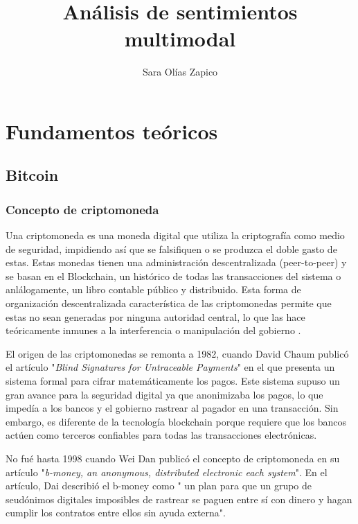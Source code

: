 \documentclass[11pt]{article} %
\title{Análisis de sentimientos multimodal}
\author{Sara Olías Zapico}
\begin{document}
	\maketitle
\renewcommand{\refname}{Bibliografía}

\tableofcontents

\newpage

\section{Fundamentos teóricos}

\subsection{Bitcoin}

\subsubsection{Concepto de criptomoneda}

Una criptomoneda es una moneda digital que utiliza la criptografía como medio de seguridad, impidiendo así que se falsifiquen o se produzca el doble gasto de estas. Estas monedas tienen una administración descentralizada (peer-to-peer) y se basan en el Blockchain, un histórico de todas las transacciones del sistema o anlálogamente, un libro contable público y distribuido. Esta forma de organización descentralizada característica de las criptomonedas permite que estas no sean generadas por ninguna autoridad central, lo que las hace teóricamente inmunes a la interferencia o manipulación del gobierno \cite{cryptocurrency}.

El origen de las criptomonedas se remonta a 1982, cuando David Chaum publicó el artículo "\textit{Blind Signatures for Untraceable Payments}" \cite{Chaum} en el que presenta un sistema formal para cifrar matemáticamente los pagos. Este sistema supuso un gran avance para la seguridad digital ya que anonimizaba los pagos, lo que impedía a los bancos y el gobierno rastrear al pagador en una transacción. Sin embargo, es diferente de la tecnología blockchain porque requiere que los bancos actúen como terceros confiables para todas las transacciones electrónicas.

No fué hasta 1998 cuando Wei Dan publicó el concepto de criptomoneda en su artículo "\textit{b-money, an anonymous, distributed electronic each system}". En el artículo,  Dai describió el b-money como " \textit{}un plan para que un grupo de seudónimos digitales imposibles de rastrear se paguen entre sí con dinero y hagan cumplir los contratos entre ellos sin ayuda externa". 
\end{document}
